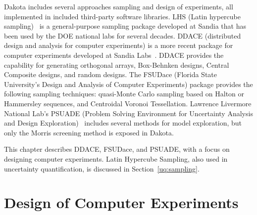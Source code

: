 Dakota includes several approaches sampling and design of experiments,
all implemented in included third-party software libraries.  LHS
(Latin hypercube sampling)~\cite{Swi04} is a general-purpose sampling
package developed at Sandia that has been used by the DOE national
labs for several decades. DDACE (distributed design and analysis for
computer experiments) is a more recent package for computer
experiments developed at Sandia Labs~\cite{TonXX}. DDACE provides the
capability for generating orthogonal arrays, Box-Behnken designs,
Central Composite designs, and random designs.  The FSUDace (Florida
State University's Design and Analysis of Computer Experiments)
package provides the following sampling techniques: quasi-Monte Carlo
sampling based on Halton or Hammersley sequences, and Centroidal
Voronoi Tessellation.  Lawrence Livermore National Lab's PSUADE
(Problem Solving Environment for Uncertainty Analysis and Design
Exploration)~\cite{Ton05} includes several methods for model
exploration, but only the Morris screening method is exposed in
Dakota.

This chapter describes DDACE, FSUDace, and PSUADE, with a focus on
designing computer experiments. Latin Hypercube Sampling, also used in
uncertainty quantification, is discussed in Section~\ref{uq:sampling}.
\begin{comment}
The differences between sampling used in design of experiments and
sampling used in uncertainty quantification is discussed in more
detail in the following paragraphs. In brief, we consider design of
experiment methods to generate sets of uniform random variables on the
interval $[0,1]$. These sets are mapped to the lower/upper bounds of
the problem variables and then the response functions are evaluated at
the sample input points with the goal of characterizing the behavior
of the response functions over the input parameter ranges of
interest. Uncertainty quantification via LHS sampling, in contrast,
involves characterizing the uncertain input variables with probability
distributions such as normal, Weibull, triangular, etc., sampling from
the input distributions, and propagating the input uncertainties to
obtain a cumulative distribution function on the output. There is
significant overlap between design of experiments and sampling. Often,
both techniques can be used to obtain similar results about the
behavior of the response functions and about the relative importance
of the input variables.
\end{comment}

\section{Design of Computer Experiments}\label{dace:background}

